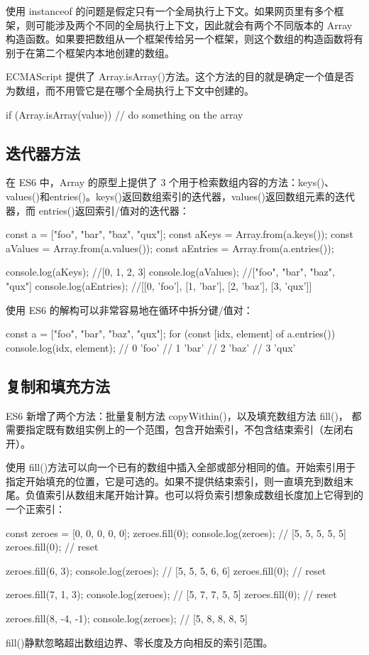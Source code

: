 使用 instanceof 的问题是假定只有一个全局执行上下文。如果网页里有多个框架，则可能涉及两个不同的全局执行上下文，因此就会有两个不同版本的 Array 构造函数。如果要把数组从一个框架传给另一个框架，则这个数组的构造函数将有别于在第二个框架内本地创建的数组。

ECMAScript 提供了 Array.isArray()方法。这个方法的目的就是确定一个值是否为数组，而不用管它是在哪个全局执行上下文中创建的。
\begin{js}
    if (Array.isArray(value)) {
            // do something on the array
        }
\end{js}

\subsection{迭代器方法}
在 ES6 中，Array 的原型上提供了 3 个用于检索数组内容的方法：keys()、values()和entries()。keys()返回数组索引的迭代器，values()返回数组元素的迭代器，而 entries()返回索引/值对的迭代器：
\begin{js}
    const a = ["foo", "bar", "baz", "qux"];
    const aKeys = Array.from(a.keys());
    const aValues = Array.from(a.values());
    const aEntries = Array.from(a.entries());

    console.log(aKeys); //[0, 1, 2, 3]
    console.log(aValues); //["foo", "bar", "baz", "qux"]
    console.log(aEntries); //[[0, 'foo'], [1, 'bar'], [2, 'baz'], [3, 'qux']]
\end{js}

使用 ES6 的解构可以非常容易地在循环中拆分键/值对：
\begin{js}
    const a = ["foo", "bar", "baz", "qux"];
    for (const [idx, element] of a.entries()) {
            console.log(idx, element);
        }
    // 0 'foo'
    // 1 'bar'
    // 2 'baz'
    // 3 'qux'
\end{js}
\subsection{复制和填充方法}
ES6 新增了两个方法：批量复制方法 copyWithin()，以及填充数组方法 fill()， 都需要指定既有数组实例上的一个范围，包含开始索引，不包含结束索引（左闭右开）。

使用 fill()方法可以向一个已有的数组中插入全部或部分相同的值。开始索引用于指定开始填充的位置，它是可选的。如果不提供结束索引，则一直填充到数组末尾。负值索引从数组末尾开始计算。也可以将负索引想象成数组长度加上它得到的一个正索引：

\begin{js}
    const zeroes = [0, 0, 0, 0, 0];
    zeroes.fill(0);
    console.log(zeroes); // [5, 5, 5, 5, 5]
    zeroes.fill(0); // reset

    zeroes.fill(6, 3);
    console.log(zeroes); // [5, 5, 5, 6, 6]
    zeroes.fill(0); // reset

    zeroes.fill(7, 1, 3);
    console.log(zeroes); // [5, 7, 7, 5, 5]
    zeroes.fill(0); // reset

    zeroes.fill(8, -4, -1);
    console.log(zeroes); // [5, 8, 8, 8, 5]
\end{js}
fill()静默忽略超出数组边界、零长度及方向相反的索引范围。

